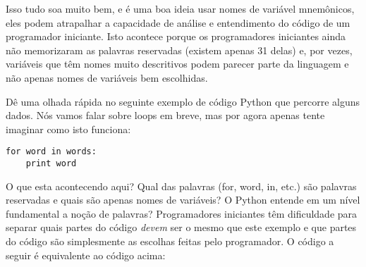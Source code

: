 {{{{{{{{{{{{{{{{{Isso tudo soa muito bem, e é uma boa ideia usar nomes de variável mnemônicos, 
eles podem atrapalhar a capacidade de análise e 
entendimento do código de um programador iniciante. Isto acontece porque os programadores iniciantes 
ainda não memorizaram as palavras reservadas (existem apenas 31 delas) e, por vezes, 
variáveis que têm nomes muito descritivos podem parecer 
parte da linguagem e não apenas nomes de variáveis bem escolhidas.

Dê uma olhada rápida no seguinte exemplo de código Python que percorre alguns dados. 
Nós vamos falar sobre loops em breve, mas por agora apenas tente imaginar como isto funciona:

\beforeverb
\begin{verbatim}
for word in words:
    print word
\end{verbatim}
\afterverb
%
O que esta acontecendo aqui? Qual das palavras (for, word, in, etc.) são palavras reservadas 
e quais são apenas nomes de variáveis? O Python entende em um nível fundamental 
a noção de palavras? Programadores iniciantes têm 
dificuldade para separar quais partes 
do código \emph{devem} ser o mesmo que este exemplo e que partes do código são simplesmente 
as escolhas feitas pelo programador.
%
O código a seguir é equivalente ao código acima:
%


}}}}}}}}}}}}}}}}}
